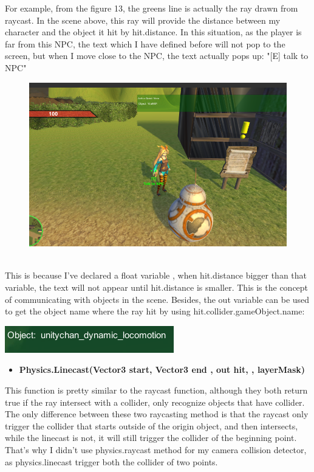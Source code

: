 \documentclass[a4paper, 13pt]{extarticle}
\begin{document}
 	For example, from the figure 13, the greens line is actually the ray drawn from raycast. In the scene above, this ray will provide the distance between my character and the object it hit by hit.distance. In this situation, as the player is far from this NPC, the text which I have defined before will not pop to the screen, but when I move close to the NPC, the text actually pops up: "[E] talk to NPC"
 	\begin{figure}[h]
 		
 			\begin{minipage}{1\textwidth}
 				\centering
 				\includegraphics[width=0.5\linewidth]{intructions/text_popup.png}
 				\centering
 				\label{fig:test15}
 			\end{minipage}
 		\end{figure}
 	\\[0.05cm]
 	This is because I've declared a float variable , when hit.distance bigger than that variable, the text will not appear until hit.distance is smaller. This is the concept of communicating with objects in the scene. Besides, the out variable can be used to get the object name where the ray hit by using hit.collider.gameObject.name: 	
 	\noindent\begin{minipage}{0.3\textwidth}
 		\includegraphics[width=\linewidth]{intructions/objectname.png}
 	\end{minipage}
 	\newpage
 	\begin{itemize}
 		\item \bfseries Physics.Linecast(Vector3 start,  Vector3 end , out hit, , layerMask)	 	
 	\end{itemize}
 		This function is pretty similar to the raycast function, although they both return true if the ray intersect with a collider, only recognize objects that have collider. The only difference between these two raycasting method is that the raycast only trigger the collider that starts outside of the origin object, and then intersects,  while the linecast is not, it will still trigger the collider of the beginning point. That's why I didn't use physics.raycast method for my camera collision detector, as physics.linecast trigger both the collider of two points.
 
\end{document}

